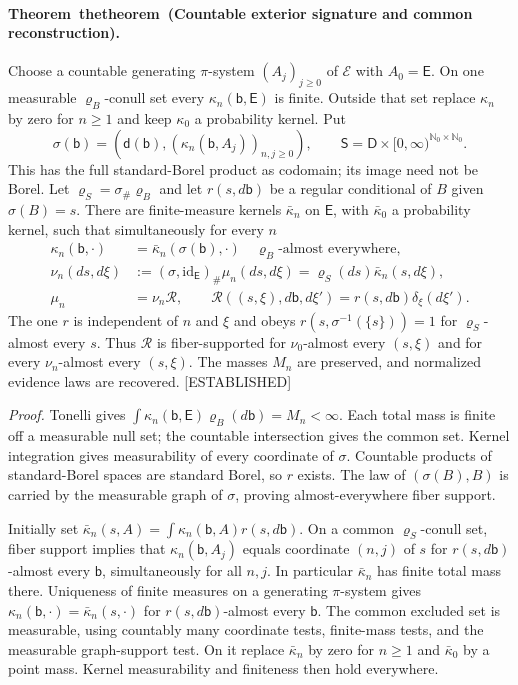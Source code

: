 \documentclass[11pt,letterpaper]{report}
\newcounter{statementsequence}[chapter]
\newcommand{\syncstatementcounter}[1]{\stepcounter{statementsequence}\setcounter{#1}{\numexpr\value{statementsequence}-1\relax}\refstepcounter{#1}}
\newcommand{\resultheading}[4]{\syncstatementcounter{#2}\label{#4}\paragraph{#1~\csname the#2\endcsname\ (#3).}}
\newcommand{\theoremheading}[2]{\resultheading{Theorem}{theorem}{#1}{#2}}
\newcommand{\status}[1]{\mbox{{\small\textsc{\textcolor{red!45!black}{[#1]}}}}}
\begin{document}
\theoremheading{Countable exterior signature and common reconstruction}{thm:sf-boundary-signature}
Choose a countable generating $\pi$-system $(A_j)_{j\ge0}$ of $\mathscr E$ with $A_0=\mathsf E$. On one measurable $\varrho_B$-conull set every $\kappa_n({\mathsf b},\mathsf E)$ is finite. Outside that set replace $\kappa_n$ by zero for $n\ge1$ and keep $\kappa_0$ a probability kernel. Put
\begin{equation}
\sigma({\mathsf b})=\left({\mathsf d}({\mathsf b}),(\kappa_n({\mathsf b},A_j))_{n,j\ge0}\right),
\qquad
\mathsf S=\mathsf D\times[0,\infty)^{\mathbb N_0\times\mathbb N_0}.
\label{eq:sf-boundary-signature}
\end{equation}
This has the full standard-Borel product as codomain; its image need not be Borel. Let $\varrho_S=\sigma_\#\varrho_B$ and let $r(s,d{\mathsf b})$ be a regular conditional of $B$ given $\sigma(B)=s$. There are finite-measure kernels $\bar\kappa_n$ on $\mathsf E$, with $\bar\kappa_0$ a probability kernel, such that simultaneously for every $n$
\begin{align}
\kappa_n({\mathsf b},\cdot)&=\bar\kappa_n(\sigma({\mathsf b}),\cdot)
\quad\varrho_B\text{-almost everywhere},\\
\nu_n(ds,d\xi)&:=(\sigma,\mathrm{id}_{\mathsf E})_\#\mu_n(ds,d\xi)
=\varrho_S(ds)\bar\kappa_n(s,d\xi),\\
\mu_n&=\nu_n\mathcal R,
\qquad
\mathcal R((s,\xi),d{\mathsf b},d\xi')=r(s,d{\mathsf b})\delta_\xi(d\xi').
\label{eq:sf-boundary-common-recovery}
\end{align}
The one $r$ is independent of $n$ and $\xi$ and obeys $r(s,\sigma^{-1}(\{s\}))=1$ for $\varrho_S$-almost every $s$. Thus $\mathcal R$ is fiber-supported for $\nu_0$-almost every $(s,\xi)$ and for every $\nu_n$-almost every $(s,\xi)$. The masses $M_n$ are preserved, and normalized evidence laws are recovered. \status{ESTABLISHED}

\noindent\emph{Proof.}
Tonelli gives $\int\kappa_n({\mathsf b},\mathsf E)\varrho_B(d{\mathsf b})=M_n<\infty$. Each total mass is finite off a measurable null set; the countable intersection gives the common set. Kernel integration gives measurability of every coordinate of $\sigma$. Countable products of standard-Borel spaces are standard Borel, so $r$ exists. The law of $(\sigma(B),B)$ is carried by the measurable graph of $\sigma$, proving almost-everywhere fiber support.

Initially set $\bar\kappa_n(s,A)=\int\kappa_n({\mathsf b},A)r(s,d{\mathsf b})$. On a common $\varrho_S$-conull set, fiber support implies that $\kappa_n({\mathsf b},A_j)$ equals coordinate $(n,j)$ of $s$ for $r(s,d{\mathsf b})$-almost every ${\mathsf b}$, simultaneously for all $n,j$. In particular $\bar\kappa_n$ has finite total mass there. Uniqueness of finite measures on a generating $\pi$-system gives $\kappa_n({\mathsf b},\cdot)=\bar\kappa_n(s,\cdot)$ for $r(s,d{\mathsf b})$-almost every ${\mathsf b}$. The common excluded set is measurable, using countably many coordinate tests, finite-mass tests, and the measurable graph-support test. On it replace $\bar\kappa_n$ by zero for $n\ge1$ and $\bar\kappa_0$ by a point mass. Kernel measurability and finiteness then hold everywhere.
\end{document}
